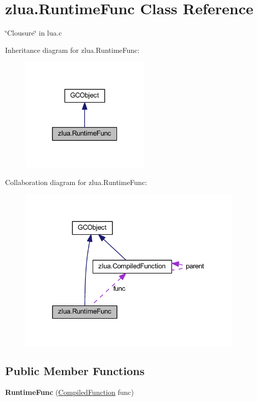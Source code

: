 \hypertarget{classzlua_1_1_runtime_func}{}\section{zlua.\+Runtime\+Func Class Reference}
\label{classzlua_1_1_runtime_func}


\char`\"{}\+Clousure\char`\"{} in lua.\+c  




Inheritance diagram for zlua.\+Runtime\+Func\+:
\nopagebreak
\begin{figure}[H]
\begin{center}
\leavevmode
\includegraphics[width=175pt]{classzlua_1_1_runtime_func__inherit__graph}
\end{center}
\end{figure}


Collaboration diagram for zlua.\+Runtime\+Func\+:
\nopagebreak
\begin{figure}[H]
\begin{center}
\leavevmode
\includegraphics[width=305pt]{classzlua_1_1_runtime_func__coll__graph}
\end{center}
\end{figure}
\subsection*{Public Member Functions}
\begin{DoxyCompactItemize}
\item 
\mbox{\label{classzlua_1_1_runtime_func_aeea097d2d35cfc06c0a03cb2164286ca}} 
{\bfseries Runtime\+Func} (\mbox{\hyperlink{classzlua_1_1_compiled_function}{Compiled\+Function}} func)
\end{DoxyCompactItemize}
